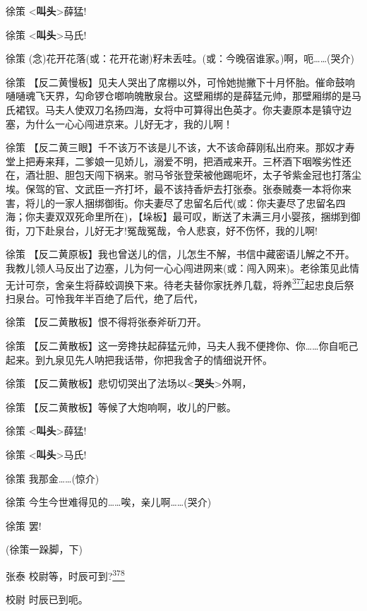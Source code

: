 徐策 \textless{}\textbf{叫头}\textgreater{}薛猛!

徐策 \textless{}\textbf{叫头}\textgreater{}马氏!

徐策
(念)花开花落(或：花开花谢)籽未丢哇。(或：今晚宿谁家。)啊，呃\ldots{}\ldots{}(哭介)

徐策
【反二黄慢板】见夫人哭出了席棚以外，可怜她抛撇下十月怀胎。催命鼓响嗵嗵魂飞天界，勾命锣仓啷响魄散泉台。这壁厢绑的是薛猛元帅，那壁厢绑的是马氏裙钗。马夫人使双刀名扬四海，女将中可算得出色英才。你夫妻原本是镇守边塞，为什么一心心闯进京来。儿好无才，我的儿啊！

徐策
【反二黄三眼】千不该万不该是儿不该，大不该命薛刚私出府来。那奴才寿堂上把寿来拜，二爹娘一见娇儿，溺爱不明，把酒戒来开。三杯酒下咽喉劣性还在，酒壮胆、胆包天闯下祸来。驸马爷张登荣被他踢呃坏，太子爷紫金冠也打落尘埃。保驾的官、文武臣一齐打坏，最不该持香炉去打张泰。张泰贼奏一本将你来害，将儿的一家人捆绑御街。你夫妻尽了忠留名后代(或：你夫妻尽了忠留名四海；你夫妻双双死命里所在)，【垛板】最可叹，断送了未满三月小婴孩，捆绑到御街，刀下赴泉台，儿好无才!冤哉冤哉，令人悲哀，好不伤怀，我的儿啊!

徐策
【反二黄原板】我也曾送儿的信，儿怎生不解，书信中藏密语儿解之不开。我教儿领人马反出了边塞，儿为何一心心闯进网来(或：闯入网来)。老徐策见此情无计可奈，舍亲生将薛蛟调换下来。待老夫替你家抚养几载，将养\protect\hyperlink{fn377}{\textsuperscript{377}}起忠良后祭扫泉台。可怜我年半百绝了后代，绝了后代，

徐策 【反二黄散板】恨不得将张泰斧斫刀开。

徐策
【反二黄散板】这一旁搀扶起薛猛元帅，马夫人我不便搀你、你\ldots{}\ldots{}你自呃己起来。到九泉见先人呐把我话带，你把我舍子的情细说开怀。

徐策
【反二黄散板】悲切切哭出了法场以\textless{}\textbf{哭头}\textgreater{}外啊，

徐策 【反二黄散板】等候了大炮响啊，收儿的尸骸。

徐策 \textless{}\textbf{叫头}\textgreater{}薛猛!

徐策 \textless{}\textbf{叫头}\textgreater{}马氏!

徐策 我那金\ldots{}\ldots{}(惊介)

徐策 今生今世难得见的\ldots{}\ldots{}唉，亲儿啊\ldots{}\ldots{}(哭介)

徐策 罢!

(徐策一跺脚，下)

张泰 校尉等，时辰可到?\protect\hyperlink{fn378}{\textsuperscript{378}}

校尉 时辰已到呃。

